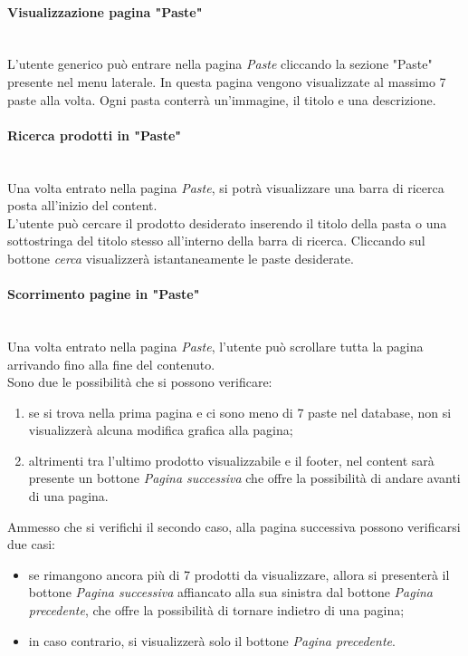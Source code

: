 \paragraph{Visualizzazione pagina "Paste"}\mbox{}\\
\label{par:VisPaste}
L'utente generico può entrare nella pagina \emph{Paste} cliccando la sezione "Paste" presente nel menu laterale.
In questa pagina vengono visualizzate al massimo 7 paste alla volta. Ogni pasta conterrà un'immagine, il titolo e una descrizione.\\ 

\paragraph{Ricerca prodotti in "Paste"}\mbox{}\\
\label{par:CerPaste}
Una volta entrato nella pagina \emph{Paste}, si potrà visualizzare una barra di ricerca posta all'inizio del content.\\
L'utente può cercare il prodotto desiderato inserendo il titolo della pasta o una sottostringa del titolo stesso all'interno della barra di ricerca. Cliccando sul bottone 
\emph{cerca} visualizzerà istantaneamente le paste desiderate.

\paragraph{Scorrimento pagine in "Paste"}\mbox{}\\
\label{par:PrevNextPaste}
Una volta entrato nella pagina \emph{Paste}, l'utente può scrollare tutta la pagina arrivando fino alla fine del contenuto.\\
Sono due le possibilità che si possono verificare:
\begin{enumerate}
	\item se si trova nella prima pagina e ci sono meno di 7 paste nel database, non si visualizzerà alcuna modifica grafica alla pagina;
	\item altrimenti tra l'ultimo prodotto visualizzabile e il footer, nel content sarà presente un bottone \emph{Pagina successiva} che offre la possibilità di andare avanti 
	di una pagina.
\end{enumerate}	
Ammesso che si verifichi il secondo caso, alla pagina successiva possono verificarsi due casi:
\begin{itemize}
	\item se rimangono ancora più di 7 prodotti da visualizzare, allora si presenterà il bottone \emph{Pagina successiva} affiancato alla sua sinistra dal 
	bottone \emph{Pagina precedente}, che offre la possibilità di tornare indietro di una pagina;
	\item in caso contrario, si visualizzerà solo il bottone \emph{Pagina precedente}.
\end{itemize}	

